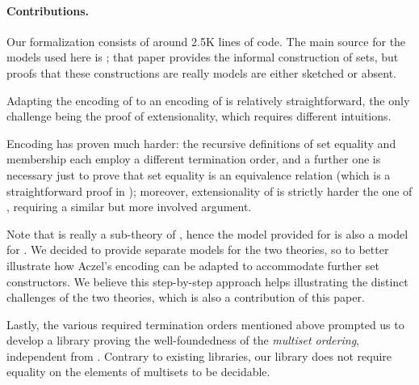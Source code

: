 \documentclass[sigplan,10pt,anonymous,review]{acmart}%
\begin{document}
\noindent
\paragraph{Contributions.}
Our formalization consists of around 2.5K lines of \Coq{} code. The main source for the models used here is \cite{Forster2001}; that paper provides the informal construction of \NFX{} sets, but proofs that these constructions are really models are either sketched or absent.

Adapting the encoding of \ZF{} to an encoding of \NFTWO{} is relatively straightforward, the only challenge being the proof of extensionality, which requires different intuitions.

Encoding \NFO{} has proven much harder: the recursive definitions of set equality and membership each employ a different termination order, and a further one is necessary just to prove that set equality is an equivalence relation (which is a straightforward proof in \ZF); moreover, extensionality of \NFO{} is strictly harder the one of \NFTWO{}, requiring a similar but more involved argument.

Note that \NFTWO{} is really a sub-theory of \NFO, hence the model provided for \NFO{} is also a model for \NFTWO. We decided to provide separate models for the two theories, so to better illustrate how Aczel's encoding can be adapted to accommodate further set constructors. We believe this step-by-step approach helps illustrating the distinct challenges of the two theories, which is also a contribution of this paper.

Lastly, the various required termination orders mentioned above prompted us to develop a \Coq{} library proving the well-foundedness of the \emph{multiset ordering}, independent from \NFX. Contrary to existing libraries, our library does not require equality on the elements of multisets to be decidable.


\section{\ZF}
\label{sect:zf}


\section{\NFTWO}
\label{sect:nf2}


\section{\NFO}
\label{sect:nfo}

\end{document}
